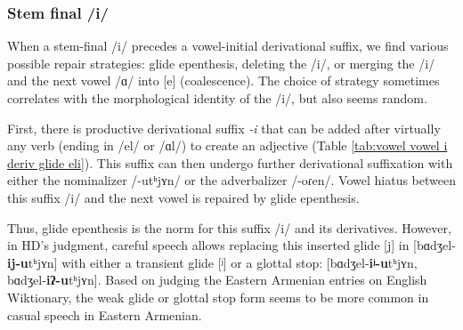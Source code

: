 {	
	
	\subsubsection{Stem final /i/}\label{section:syllable:VowelHiatus:Derived:I}
	When a stem-final /i/ precedes a vowel-initial derivational suffix, we   find various possible repair strategies: glide epenthesis, deleting the /i/, or merging the /i/ and the next vowel /ɑ/ into [e] (coalescence). The choice of strategy sometimes correlates with the morphological identity of the /i/, but also seems random.
	
	First, there is productive  derivational suffix \textit{-i} that can be added after virtually any verb (ending in /el/ or /ɑl/) to create an adjective (Table \ref{tab:vowel vowel i deriv glide eli}). This suffix can then undergo further derivational suffixation with either the nominalizer /-utʰjʏn/ or the adverbalizer /-oɾen/. Vowel hiatus between this suffix /i/ and the next vowel is repaired by glide epenthesis. 
	
	
	\begin{table}[H]
		\centering
		\caption{Glide epenthesis in derivation for  stems with deverbal suffix [-i]}
		\label{tab:vowel vowel i deriv glide eli}
		\end{table}
	
	Thus, glide epenthesis is the norm for this suffix /i/ and its derivatives. However, in HD's judgment, careful speech allows replacing this inserted glide [j] in [bɑdʒel-\textbf{ij-u}tʰjʏn] with either a transient glide [ʲ] or a glottal stop: [bɑdʒel-\textbf{iʲ-u}tʰjʏn, bɑdʒel-\textbf{iʔ-u}tʰjʏn]. Based on judging the Eastern Armenian entries on English Wiktionary, the weak glide or glottal stop form seems to be more common in casual speech in Eastern Armenian. 
	
}
